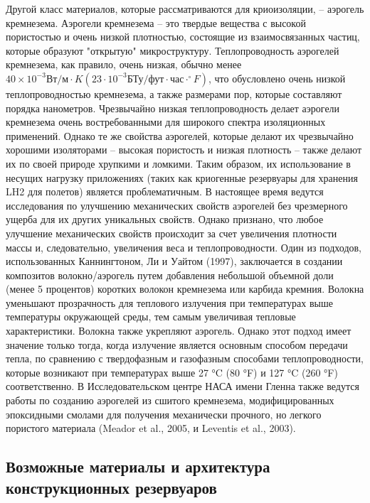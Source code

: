 Другой класс материалов, которые рассматриваются для криоизоляции, -- аэрогель кремнезема. Аэрогели кремнезема -- это твердые вещества с высокой пористостью и очень низкой плотностью, состоящие из взаимосвязанных частиц, которые образуют "открытую" микроструктуру. Теплопроводность аэрогелей кремнезема, как правило, очень низкая, обычно менее \(40\times10^{-3} \text{Вт/м} \cdot K (23 \cdot 10^{-3} \text{БТу/фут} \cdot \text{час}\cdot ^{\circ}F) \), что обусловлено очень низкой теплопроводностью кремнезема, а также размерами пор, которые составляют порядка нанометров. Чрезвычайно низкая теплопроводность делает аэрогели кремнезема очень востребованными для широкого спектра изоляционных применений. Однако те же свойства аэрогелей, которые делают их чрезвычайно хорошими изоляторами -- высокая пористость и низкая плотность -- также делают их по своей природе хрупкими и ломкими. Таким образом, их использование в несущих нагрузку приложениях (таких как криогенные резервуары для хранения LH2 для полетов) является проблематичным. В настоящее время ведутся исследования по улучшению механических свойств аэрогелей без чрезмерного ущерба для их других уникальных свойств. Однако
признано, что любое улучшение механических свойств происходит за счет увеличения плотности массы и, следовательно, увеличения веса и теплопроводности. Один из подходов, использованных Каннингтоном, Ли и Уайтом (1997), заключается в создании композитов волокно/аэрогель путем добавления небольшой объемной доли (менее 5 процентов) коротких волокон кремнезема или карбида кремния. Волокна уменьшают прозрачность для теплового излучения при температурах выше температуры окружающей среды, тем самым увеличивая тепловые характеристики. Волокна также укрепляют аэрогель. Однако этот подход имеет значение только тогда, когда излучение является основным способом передачи тепла, по сравнению с твердофазным и газофазным способами теплопроводности, которые возникают при температурах выше 27 °C (80 °F) и 127 °C (260 °F) соответственно. В Исследовательском центре НАСА имени Гленна также ведутся работы по созданию аэрогелей из сшитого кремнезема, модифицированных эпоксидными смолами для получения механически прочного, но легкого пористого материала (Meador et al., 2005, и Leventis et al., 2003).


\subsection{Возможные материалы и архитектура конструкционных резервуаров}\label{ch:overview:1:sec4:sub2}

